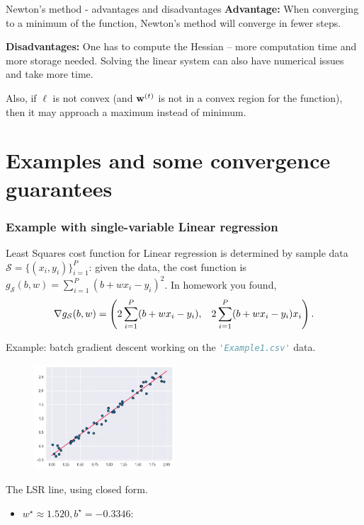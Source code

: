 \documentclass{beamer}
\newcommand{\ct}[1]{\lstinline[language=Python]!#1!}
\begin{document}
\begin{frame}{Newton's method - advantages and disadvantages}
    \textbf{Advantage:} When converging to a minimum of the function, Newton's method will converge in fewer steps.

    \textbf{Disadvantages:} One has to compute the Hessian {--} more computation time and more storage needed. Solving the linear system can also have numerical issues and take more time.

    Also, if $\ell$ is not convex (and ${\bf w}^{(t)}$ is not in a convex region for the function), then it may approach a maximum instead of minimum.

\end{frame}

\section{Examples and some convergence guarantees}
\begin{frame}
\frametitle{Example with single-variable Linear regression}
    Least Squares cost function for Linear regression is determined by sample data $\mathcal S=\{(x_i,y_i)\}_{i=1}^P$: given the data, the cost function is $g_{\mathcal S}(b,w) = \sum_{i=1}^P(b+wx_i - y_i)^2$. In homework you found, 
        \[\nabla g_{\mathcal S}(b,w) = 
        {\footnotesize
        \left( 2\sum_{i=1}^P(b+wx_i - y_i), \quad 2\sum_{i=1}^P(b+wx_i - y_i)x_i \right).
        }
        \]
    
    \pause
    Example: batch gradient descent working on the \ct{'Example1.csv'} data.

    \begin{figure}
        \includegraphics[width=0.47\textwidth]{../../Images/example1-lsrline.png}
    \end{figure}
    \phantom{line} \newline 
    \vfill
    The LSR line, using closed form. 
    \begin{itemize}
        \item $w^\star\approx 1.520, b^\star=-0.3346$:
    \end{itemize}
    \vspace{48pt}
    \vfill
\end{frame}
\end{document}
